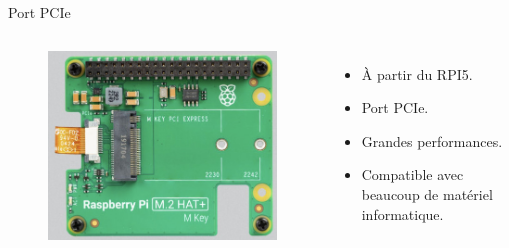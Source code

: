 \documentclass[aspectratio=169,xcolor=dvipsnames]{beamer}
\begin{document}
\begin{frame}{Port PCIe}
    \begin{columns}[c] %

        \begin{figure}
            \includegraphics[width=1\textwidth]{images/pcie_hat_top.jpg}
        \end{figure}

        \begin{itemize}
            \item À partir du RPI5.
            \item Port PCIe.
            \item Grandes performances.
            \item Compatible avec beaucoup de matériel informatique.
        \end{itemize}

    \end{columns}
\end{frame}
\end{document}
